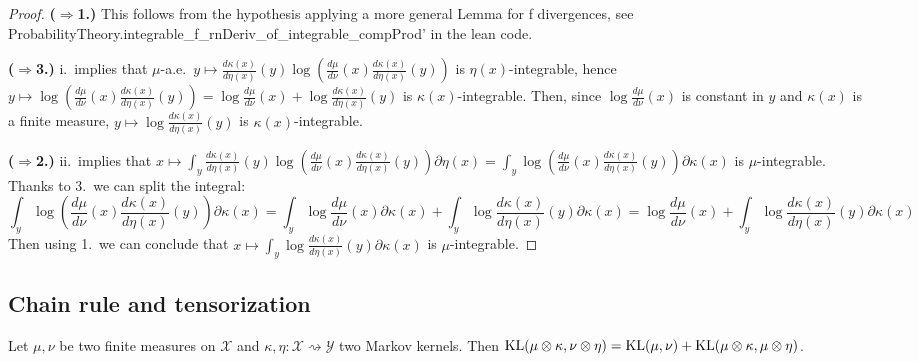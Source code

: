 \begin{proof}
{\bfseries($\Rightarrow$1.)} This follows from the hypothesis applying a more general Lemma for f divergences, see ProbabilityTheory.integrable\_f\_rnDeriv\_of\_integrable\_compProd' in the lean code.

{\bfseries($\Rightarrow$3.)} i.\ implies that $\mu$-a.e.\ $y \mapsto \frac{d \kappa(x)}{d \eta(x)}(y) \log \left(\frac{d \mu}{d \nu}(x) \frac{d \kappa(x)}{d \eta(x)}(y) \right)$ is $\eta(x)$-integrable, hence $y \mapsto \log \left(\frac{d \mu}{d \nu}(x) \frac{d \kappa(x)}{d \eta(x)}(y) \right) = \log \frac{d \mu}{d \nu}(x) + \log \frac{d \kappa(x)}{d \eta(x)}(y)$ is $\kappa(x)$-integrable. Then, since $\log \frac{d \mu}{d \nu}(x)$ is constant in $y$ and $\kappa(x)$ is a finite measure, $y \mapsto \log \frac{d \kappa(x)}{d \eta(x)}(y)$ is $\kappa(x)$-integrable.

{\bfseries($\Rightarrow$2.)} ii.\ implies that $x \mapsto  \int_y \frac{d \kappa(x)}{d \eta(x)}(y) \log \left(\frac{d \mu}{d \nu}(x) \frac{d \kappa(x)}{d \eta(x)}(y) \right) \partial \eta (x) = \int_y \log \left(\frac{d \mu}{d \nu}(x) \frac{d \kappa(x)}{d \eta(x)}(y) \right) \partial \kappa (x)$ is $\mu$-integrable. 
Thanks to 3.\ we can split the integral:
$$\int_y \log \left(\frac{d \mu}{d \nu}(x) \frac{d \kappa(x)}{d \eta(x)}(y) \right) \partial \kappa (x)
= \int_y \log \frac{d \mu}{d \nu}(x) \partial \kappa (x) + \int_y \log \frac{d \kappa(x)}{d \eta(x)}(y) \partial \kappa (x) = \log \frac{d \mu}{d \nu}(x) + \int_y \log \frac{d \kappa(x)}{d \eta(x)}(y) \partial \kappa (x)$$
Then using 1.\ we can conclude that $x \mapsto \int_y \log \frac{d \kappa(x)}{d \eta(x)}(y) \partial \kappa (x)$ is $\mu$-integrable.

\end{proof}



\subsection{Chain rule and tensorization}

\begin{theorem}
  \label{thm:kl_compProd_aux}
  Let $\mu, \nu$ be two finite measures on $\mathcal X$ and $\kappa, \eta : \mathcal X \rightsquigarrow \mathcal Y$ two Markov kernels.
  Then $\operatorname{KL}(\mu \otimes \kappa, \nu \otimes \eta) = \operatorname{KL}(\mu, \nu) + \operatorname{KL}(\mu \otimes \kappa, \mu \otimes \eta)$.
\end{theorem}

